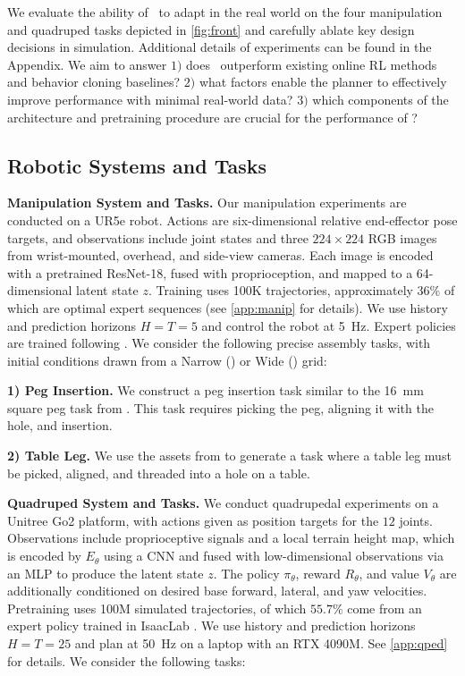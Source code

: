 We evaluate the ability of \Method\ to adapt in the real world on the four manipulation and quadruped tasks depicted in \cref{fig:front} and carefully ablate key design decisions in simulation. Additional details of experiments can be found in the Appendix. We aim to answer $1)$ does \Method \ outperform existing online RL methods and behavior cloning baselines? $2)$ what factors enable the planner to effectively improve performance with minimal real-world data?  $3)$ which components of the architecture and pretraining procedure are crucial for the performance of \Method?  


\subsection{Robotic Systems and Tasks}
\textbf{Manipulation System and Tasks. } Our manipulation experiments are conducted on a UR5e robot. Actions are six-dimensional relative end-effector pose targets, and observations include joint states and three $224\times224$ RGB images from wrist-mounted, overhead, and side-view cameras. Each image is encoded with a pretrained ResNet-18, fused with proprioception, and mapped to a 64-dimensional latent state $z$. Training uses 100K trajectories, approximately $36\%$ of which are optimal expert sequences (see \cref{app:manip} for details). We use history and prediction horizons $H=T=5$ and control the robot at \SI{5}{\hertz}. Expert policies are trained following \cite{yin2026emergent}. We consider the following precise assembly tasks, with initial conditions drawn from a Narrow () or Wide () grid:
\begin{hangingpar}
\textbf{1) Peg Insertion.} We construct a peg insertion task similar to the \SI{16}{\mm} square peg task from \cite{narang2022factory}. This task requires picking the peg, aligning it with the hole, and insertion.
\end{hangingpar}
\begin{hangingpar}
\textbf{2) Table Leg.} We use the assets from \cite{heo2023furniturebench} to generate a task where a table leg must be picked, aligned, and threaded into a hole on a table.
\end{hangingpar}
\textbf{Quadruped System and Tasks.} We conduct quadrupedal experiments on a Unitree Go2 platform, with actions given as position targets for the $12$ joints. Observations include proprioceptive signals and a local terrain height map, which is encoded by $E_\theta$ using a CNN and fused with low-dimensional observations via an MLP to produce the latent state $z$. The policy $\pi_\theta$, reward $R_\theta$, and value $V_\theta$ are additionally conditioned on desired base forward, lateral, and yaw velocities. Pretraining uses 100M simulated trajectories, of which $55.7\%$ come from an expert policy trained in IsaacLab \cite{mittal2025isaaclab}. We use history and prediction horizons $H=T=25$ and plan at \SI{50}{\hertz} on a laptop with an RTX 4090M. See \cref{app:qped} for details. We consider the following tasks: 
